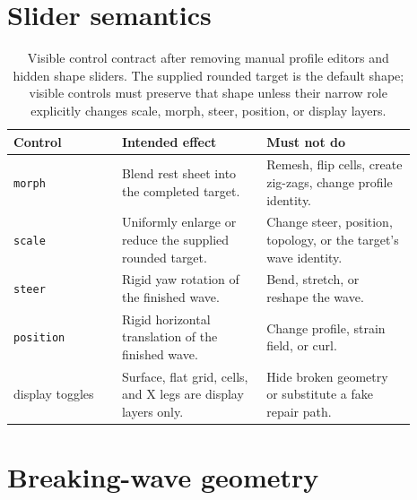 \documentclass[12pt,letterpaper]{article}
\newcommand{\code}[1]{\texttt{#1}}
\begin{document}
\section{Slider semantics}

\begin{table}[H]
\centering
{\small
\begin{tabular}{@{}Y{0.24\linewidth}Y{0.32\linewidth}Y{0.33\linewidth}@{}}
\toprule
Control & Intended effect & Must not do \\
\midrule
\code{morph} & Blend rest sheet into the completed target. & Remesh, flip cells, create zig-zags, change profile identity. \\
\code{scale} & Uniformly enlarge or reduce the supplied rounded target. & Change steer, position, topology, or the target's wave identity. \\
\code{steer} & Rigid yaw rotation of the finished wave. & Bend, stretch, or reshape the wave. \\
\code{position} & Rigid horizontal translation of the finished wave. & Change profile, strain field, or curl. \\
display toggles & Surface, flat grid, cells, and X legs are display layers only. & Hide broken geometry or substitute a fake repair path. \\
\bottomrule
\end{tabular}
}
\caption{Visible control contract after removing manual profile editors and hidden shape sliders. The supplied rounded target is the default shape; visible controls must preserve that shape unless their narrow role explicitly changes scale, morph, steer, position, or display layers.}
\end{table}

\section{Breaking-wave geometry}
\end{document}
